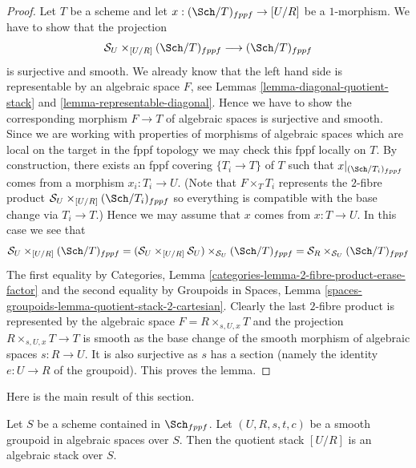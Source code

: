 \begin{proof}
Let $T$ be a scheme and let $x : (\Sch/T)_{fppf} \to [U/R]$
be a $1$-morphism. We have to show that the projection
$$
\mathcal{S}_U \times_{[U/R]} (\Sch/T)_{fppf}
\longrightarrow
(\Sch/T)_{fppf}
$$
is surjective and smooth. We already know that the left hand side
is representable by an algebraic space $F$, see
Lemmas \ref{lemma-diagonal-quotient-stack} and
\ref{lemma-representable-diagonal}.
Hence we have to show the corresponding morphism $F \to T$ of
algebraic spaces is surjective and smooth.
Since we are working with properties of morphisms of algebraic
spaces which are local on the target in the fppf topology we
may check this fppf locally on $T$. By construction, there exists
an fppf covering $\{T_i \to T\}$ of $T$ such that
$x|_{(\Sch/T_i)_{fppf}}$ comes from a morphism
$x_i : T_i \to U$. (Note that $F \times_T T_i$ represents the
$2$-fibre product $\mathcal{S}_U \times_{[U/R]} (\Sch/T_i)_{fppf}$
so everything is compatible with the base change via $T_i \to T$.)
Hence we may assume that $x$ comes from $x : T \to U$.
In this case we see that
$$
\mathcal{S}_U \times_{[U/R]} (\Sch/T)_{fppf}
=
(\mathcal{S}_U \times_{[U/R]} \mathcal{S}_U)
\times_{\mathcal{S}_U} (\Sch/T)_{fppf}
=
\mathcal{S}_R \times_{\mathcal{S}_U} (\Sch/T)_{fppf}
$$
The first equality by
Categories, Lemma \ref{categories-lemma-2-fibre-product-erase-factor}
and the second equality by
Groupoids in Spaces,
Lemma \ref{spaces-groupoids-lemma-quotient-stack-2-cartesian}.
Clearly the last $2$-fibre product is represented by the algebraic
space $F = R \times_{s, U, x} T$ and the projection
$R \times_{s, U, x} T \to T$ is smooth as the base change of
the smooth morphism of algebraic spaces $s : R \to U$.
It is also surjective as $s$ has a section (namely the identity
$e : U \to R$ of the groupoid).
This proves the lemma.
\end{proof}

\noindent
Here is the main result of this section.

\begin{theorem}
\label{theorem-smooth-groupoid-gives-algebraic-stack}
Let $S$ be a scheme contained in $\Sch_{fppf}$.
Let $(U, R, s, t, c)$ be a smooth groupoid in algebraic spaces over $S$.
Then the quotient stack $[U/R]$ is an algebraic stack over $S$.
\end{theorem}

